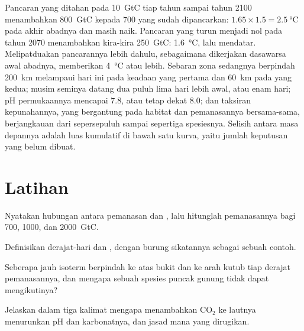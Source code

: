 \begin{example}\label{ex:b2:global-change:scenarios}
Pancaran yang ditahan pada \qty{10}{GtC} tiap tahun sampai tahun 2100
menambahkan \qty{800}{GtC} kepada \qty{700}{} yang sudah dipancarkan:
$1.65\times 1.5 =
\qty{2.5}{\celsius}$ pada akhir abadnya dan masih
naik. Pancaran yang turun menjadi nol pada tahun 2070 menambahkan
kira-kira \qty{250}{GtC}: \qty{1.6}{\celsius}, lalu mendatar.
Melipatduakan pancarannya lebih dahulu, sebagaimana dikerjakan
dasawarsa awal abadnya, memberikan \qty{4}{\celsius} atau lebih.
Sebaran zona sedangnya berpindah \qty{200}{km} melampaui hari ini pada
keadaan yang pertama dan \qty{60}{km} pada yang kedua; musim
seminya datang dua puluh lima hari lebih awal, atau enam hari; pH
permukaannya mencapai $7.8$, atau tetap dekat $8.0$; dan taksiran
kepunahannya, yang bergantung pada habitat dan pemanasannya
bersama-sama, berjangkauan dari sepersepuluh sampai sepertiga
spesiesnya. Selisih antara masa depannya adalah luas kumulatif di bawah
satu kurva, yaitu jumlah keputusan yang belum dibuat.
\end{example}

\section{Latihan}

\begin{exercise}[$\star$]\label{exo:b2:global-change:1}
Nyatakan hubungan antara pemanasan dan , lalu
hitunglah pemanasannya bagi  700, 1000, dan
\qty{2000}{GtC}.
\end{exercise}

\begin{exercise}[$\star$]\label{exo:b2:global-change:2}
Definisikan derajat-hari dan , dengan burung
sikatannya sebagai sebuah contoh.
\end{exercise}

\begin{exercise}[$\star$]\label{exo:b2:global-change:3}
Seberapa jauh isoterm berpindah ke atas bukit dan ke arah kutub tiap
derajat pemanasannya, dan mengapa sebuah spesies puncak gunung tidak
dapat mengikutinya?
\end{exercise}

\begin{exercise}[$\star$]\label{exo:b2:global-change:4}
Jelaskan dalam tiga kalimat mengapa menambahkan \ensuremath{\mathrm{CO_2}} ke lautnya
menurunkan pH dan karbonatnya, dan jasad mana yang dirugikan.
\end{exercise}

